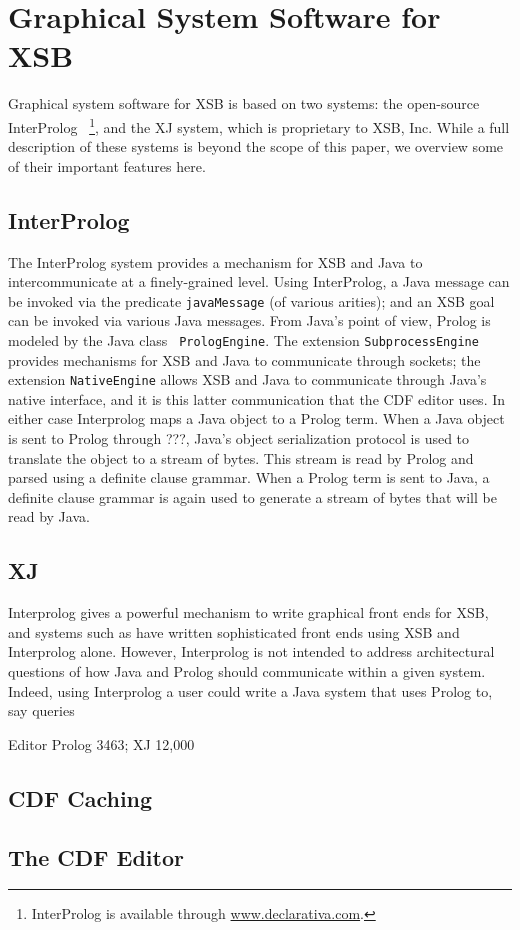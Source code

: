 \section{Graphical System Software for XSB}

Graphical system software for XSB is based on two systems: the
open-source InterProlog \cite{Cale01}~\footnote{InterProlog is
available through \url{www.declarativa.com}.}, and the XJ system,
which is proprietary to XSB, Inc.  While a full description of these
systems is beyond the scope of this paper, we overview some of their
important features here.

\subsection{InterProlog}

The InterProlog system provides a mechanism for XSB and Java to
intercommunicate at a finely-grained level.  Using InterProlog, a Java
message can be invoked via the predicate {\tt javaMessage} (of various
arities); and an XSB goal can be invoked via various Java messages.
From Java's point of view, Prolog is modeled by the Java class {\tt
PrologEngine}.  The extension {\tt SubprocessEngine} provides
mechanisms for XSB and Java to communicate through sockets; the
extension {\tt NativeEngine} allows XSB and Java to communicate
through Java's native interface, and it is this latter communication
that the CDF editor uses.  In either case Interprolog maps a Java
object to a Prolog term.  When a Java object is sent to Prolog {\sc
through ???}, Java's object serialization protocol is used to
translate the object to a stream of bytes.  This stream is read by
Prolog and parsed using a definite clause grammar.  When a Prolog term
is sent to Java, a definite clause grammar is again used to generate a
stream of bytes that will be read by Java.

\subsection{XJ}

Interprolog gives a powerful mechanism to write graphical front ends
for XSB, and systems such as \cite{LMC} have written sophisticated
front ends using XSB and Interprolog alone.  However, Interprolog is
not intended to address architectural questions of how Java and Prolog
should communicate within a given system.  Indeed, using Interprolog a
user could write a Java system that uses Prolog to, say 
queries

Editor Prolog 3463; XJ 12,000

\subsection{CDF Caching}

\subsection{The CDF Editor}

